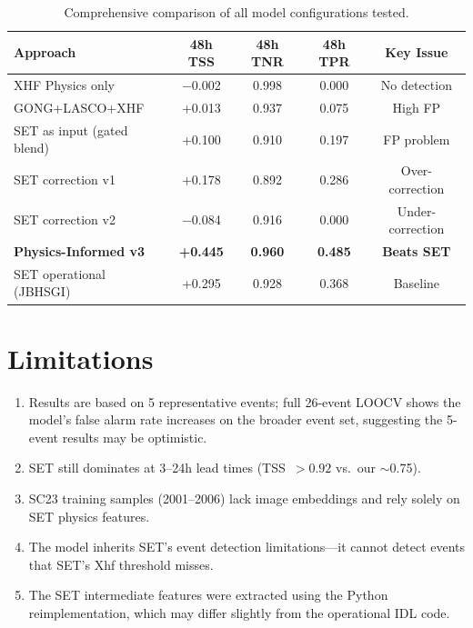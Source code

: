 \documentclass[11pt,a4paper]{article}
\begin{document}
\begin{table}[H]
\centering
\caption{Comprehensive comparison of all model configurations tested.}
\label{tab:all_approaches}
\begin{tabular}{lcccc}
\toprule
\textbf{Approach} & \textbf{48h TSS} & \textbf{48h TNR} & \textbf{48h TPR} & \textbf{Key Issue} \\
\midrule
XHF Physics only & $-$0.002 & 0.998 & 0.000 & No detection \\
GONG+LASCO+XHF & +0.013 & 0.937 & 0.075 & High FP \\
SET as input (gated blend) & +0.100 & 0.910 & 0.197 & FP problem \\
SET correction v1 & +0.178 & 0.892 & 0.286 & Over-correction \\
SET correction v2 & $-$0.084 & 0.916 & 0.000 & Under-correction \\
\rowcolor{green!10}
\textbf{Physics-Informed v3} & \textbf{+0.445} & \textbf{0.960} & \textbf{0.485} & \textbf{Beats SET} \\
SET operational (JBHSGI) & +0.295 & 0.928 & 0.368 & Baseline \\
\bottomrule
\end{tabular}
\end{table}

\section{Limitations}

\begin{enumerate}
    \item Results are based on 5 representative events; full 26-event LOOCV shows the model's false alarm rate increases on the broader event set, suggesting the 5-event results may be optimistic.
    \item SET still dominates at 3--24h lead times (TSS~$> 0.92$ vs.\ our $\sim$0.75).
    \item SC23 training samples (2001--2006) lack image embeddings and rely solely on SET physics features.
    \item The model inherits SET's event detection limitations---it cannot detect events that SET's Xhf threshold misses.
    \item The SET intermediate features were extracted using the Python reimplementation, which may differ slightly from the operational IDL code.
\end{enumerate}
\end{document}
